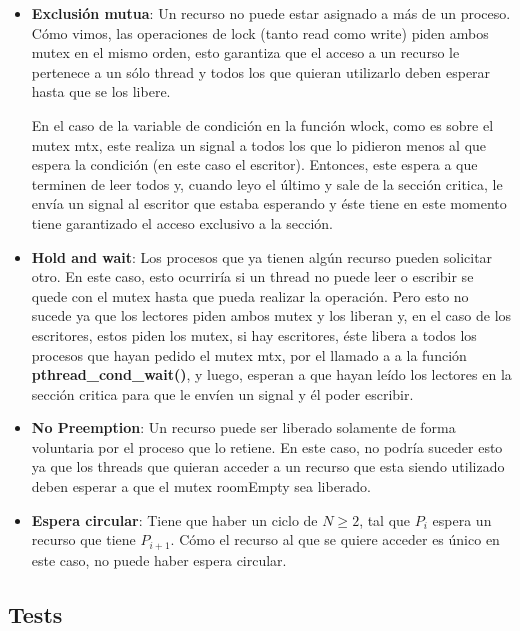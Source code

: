 \begin{itemize}
	\item \textbf{Exclusión mutua}: Un recurso no puede estar asignado a más de un proceso. 
\newline
	Cómo vimos, las operaciones de lock (tanto read como write) piden ambos mutex en el mismo orden, esto garantiza que el acceso a un recurso le pertenece a un sólo thread y todos los que quieran utilizarlo deben esperar hasta que se los libere.

	En el caso de la variable de condición en la función wlock, como es sobre el mutex mtx, este realiza un signal a todos los que lo pidieron menos al que espera la condición (en este caso el escritor). Entonces, este espera a que terminen de leer todos y, cuando leyo el último y sale de la sección critica, le envía un signal al escritor que estaba esperando y éste tiene en este momento tiene garantizado el acceso exclusivo a la sección.
	\item \textbf{Hold and wait}: Los procesos que ya tienen algún recurso pueden solicitar otro.
\newline
	En este caso, esto ocurriría si un thread no puede leer o escribir se quede con el mutex hasta que pueda realizar la operación. Pero esto no sucede ya que los lectores piden ambos mutex y los liberan y, en el caso de los escritores, estos piden los mutex, si hay escritores, éste libera a todos los procesos que hayan pedido el mutex mtx, por el llamado a  a la función \textbf{pthread\_cond\_wait()}, y luego, esperan a que hayan leído los lectores en la sección critica para que le envíen un signal y él poder escribir.
	
	\item \textbf{No Preemption}: Un recurso puede ser liberado solamente de forma voluntaria por el proceso que lo retiene.
\newline
	En este caso, no podría suceder esto ya que los threads que quieran acceder a un recurso que esta siendo utilizado deben esperar a que el mutex roomEmpty sea liberado.
	
	\item \textbf{Espera circular}: Tiene que haber un ciclo de $N \geq 2$, tal que $P_i$ espera un recurso que tiene $P_{i+1}$.
\newline
	Cómo el recurso al que se quiere acceder es único en este caso, no puede haber espera circular.
\end{itemize}


\subsection{Tests}


